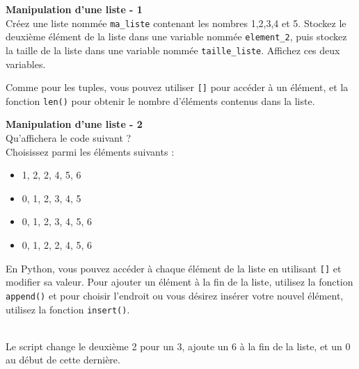      \begin{Exercice}[5 minutes] \textbf{Manipulation d'une liste - 1}\\
        Créez une liste nommée \lstinline{ma_liste} contenant les nombres 1,2,3,4 et 5. Stockez le deuxième élément de la liste dans une variable nommée \lstinline{element_2}, puis stockez la taille de la liste dans une variable nommée \lstinline{taille_liste}. Affichez ces deux variables.\\
    
        \begin{conseil}
            Comme pour les tuples, vous pouvez utiliser \lstinline{[]} pour accéder à un élément, et la fonction \lstinline{len()} pour obtenir le nombre d'éléments contenus dans la liste.
        \end{conseil}
        
        \begin{solution}
             
        \end{solution}
    \end{Exercice}
    
    \begin{Exercice}[5 minutes] \textbf{Manipulation d'une liste - 2}\\
       Qu'affichera le code suivant ? \\
       
        
       
       Choisissez parmi les éléments suivants :
       
       	\begin{itemize}
        \item 1, 2, 2, 4, 5, 6 \\
        \item 0, 1, 2, 3, 4, 5 \\
        \item 0, 1, 2, 3, 4, 5, 6 \\
        \item 0, 1, 2, 2, 4, 5, 6 \\
        \end{itemize}
    
        \begin{conseil}
            En Python, vous pouvez accéder à chaque élément de la liste en utilisant \lstinline{[]} et modifier sa valeur. Pour ajouter un élément à la fin de la liste, utilisez la fonction \lstinline{append()} et pour choisir l'endroit ou vous désirez insérer votre nouvel élément, utilisez la fonction \lstinline{insert()}.
        \end{conseil}
        
        \begin{solution}
            [0, 1, 2, 3, 4, 5, 6] \\
            Le script change le deuxième 2 pour un 3, ajoute un 6 à la fin de la liste, et un 0 au début de cette dernière.
        \end{solution}
    \end{Exercice}
    
